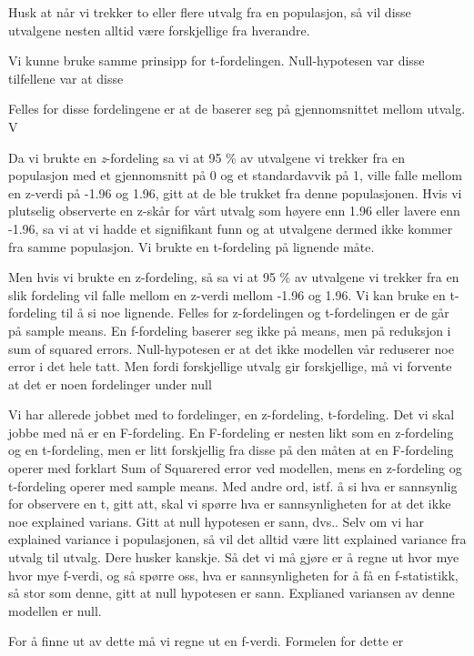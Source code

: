 \documentclass[
]{book}
\begin{document}
Husk at når vi trekker to eller flere utvalg fra en populasjon, så vil disse utvalgene nesten alltid være forskjellige fra hverandre.

Vi kunne bruke samme prinsipp for t-fordelingen. Null-hypotesen var disse tilfellene var at disse

Felles for disse fordelingene er at de baserer seg på gjennomsnittet mellom utvalg. V

Da vi brukte en \emph{z}-fordeling sa vi at 95 \% av utvalgene vi trekker fra en populasjon med et gjennomsnitt på 0 og et standardavvik på 1, ville falle mellom en z-verdi på -1.96 og 1.96, gitt at de ble trukket fra denne populasjonen. Hvis vi plutselig observerte en z-skår for vårt utvalg som høyere enn 1.96 eller lavere enn -1.96, sa vi at vi hadde et signifikant funn og at utvalgene dermed ikke kommer fra samme populasjon. Vi brukte en t-fordeling på lignende måte.

Men hvis vi brukte en z-fordeling, så sa vi at 95 \% av utvalgene vi trekker fra en slik fordeling vil falle mellom en z-verdi mellom -1.96 og 1.96. Vi kan bruke en t-fordeling til å si noe lignende. Felles for z-fordelingen og t-fordelingen er de går på sample means. En f-fordeling baserer seg ikke på means, men på reduksjon i sum of squared errors. Null-hypotesen er at det ikke modellen vår reduserer noe error i det hele tatt. Men fordi forskjellige utvalg gir forskjellige, må vi forvente at det er noen fordelinger under null

Vi har allerede jobbet med to fordelinger, en z-fordeling, t-fordeling. Det vi skal jobbe med nå er en F-fordeling. En F-fordeling er nesten likt som en z-fordeling og en t-fordeling, men er litt forskjellig fra disse på den måten at en F-fordeling operer med forklart Sum of Squarered error ved modellen, mens en z-fordeling og t-fordeling operer med sample means. Med andre ord, istf. å si hva er sannsynlig for observere en t, gitt att, skal vi spørre hva er sannsynligheten for at det ikke noe explained varians. Gitt at null hypotesen er sann, dvs.. Selv om vi har explained variance i populasjonen, så vil det alltid være litt explained variance fra utvalg til utvalg. Dere husker kanskje. Så det vi må gjøre er å regne ut hvor mye hvor mye f-verdi, og så spørre oss, hva er sannsynligheten for å få en f-statistikk, så stor som denne, gitt at null hypotesen er sann. Explianed variansen av denne modellen er null.

For å finne ut av dette må vi regne ut en f-verdi. Formelen for dette er
\end{document}
